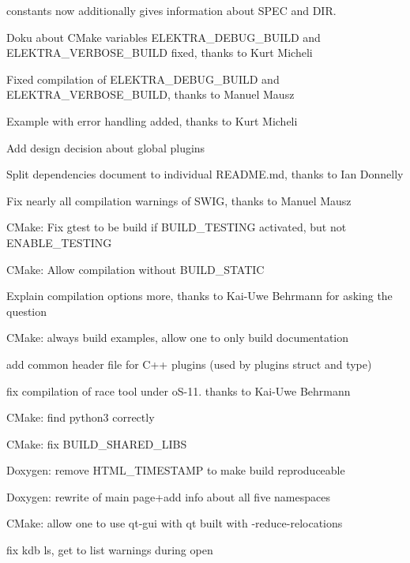 \begin{DoxyItemize}
\item constants now additionally gives information about S\+P\+E\+C and D\+I\+R.
\item Doku about C\+Make variables {\ttfamily E\+L\+E\+K\+T\+R\+A\+\_\+\+D\+E\+B\+U\+G\+\_\+\+B\+U\+I\+L\+D} and {\ttfamily E\+L\+E\+K\+T\+R\+A\+\_\+\+V\+E\+R\+B\+O\+S\+E\+\_\+\+B\+U\+I\+L\+D} fixed, thanks to Kurt Micheli
\item Fixed compilation of {\ttfamily E\+L\+E\+K\+T\+R\+A\+\_\+\+D\+E\+B\+U\+G\+\_\+\+B\+U\+I\+L\+D} and {\ttfamily E\+L\+E\+K\+T\+R\+A\+\_\+\+V\+E\+R\+B\+O\+S\+E\+\_\+\+B\+U\+I\+L\+D}, thanks to Manuel Mausz
\item Example with error handling added, thanks to Kurt Micheli
\item Add design decision about global plugins
\item Split dependencies document to individual R\+E\+A\+D\+M\+E.\+md, thanks to Ian Donnelly
\item Fix nearly all compilation warnings of S\+W\+I\+G, thanks to Manuel Mausz
\item C\+Make\+: Fix gtest to be build if {\ttfamily B\+U\+I\+L\+D\+\_\+\+T\+E\+S\+T\+I\+N\+G} activated, but not {\ttfamily E\+N\+A\+B\+L\+E\+\_\+\+T\+E\+S\+T\+I\+N\+G}
\item C\+Make\+: Allow compilation without B\+U\+I\+L\+D\+\_\+\+S\+T\+A\+T\+I\+C
\item Explain compilation options more, thanks to Kai-\/\+Uwe Behrmann for asking the question
\item C\+Make\+: always build examples, allow one to only build documentation
\item add common header file for C++ plugins (used by plugins struct and type)
\item fix compilation of race tool under o\+S-\/11. thanks to Kai-\/\+Uwe Behrmann
\item C\+Make\+: find python3 correctly
\item C\+Make\+: fix B\+U\+I\+L\+D\+\_\+\+S\+H\+A\+R\+E\+D\+\_\+\+L\+I\+B\+S
\item Doxygen\+: remove {\ttfamily H\+T\+M\+L\+\_\+\+T\+I\+M\+E\+S\+T\+A\+M\+P} to make build reproduceable
\item Doxygen\+: rewrite of main page+add info about all five namespaces
\item C\+Make\+: allow one to use qt-\/gui with qt built with -\/reduce-\/relocations
\item fix kdb ls, get to list warnings during open

\end{DoxyItemize}
